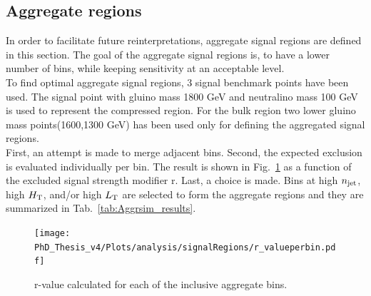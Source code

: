 \subsection{Aggregate regions}
\label{sec:aggrSR}
In order to facilitate future reinterpretations, aggregate signal regions are defined in this section. The goal of the aggregate signal regions is, to have a lower number of bins, while keeping sensitivity at an acceptable level.\\
To find optimal aggregate signal regions, 3 signal benchmark points have been used. The signal point with gluino mass 1800 GeV and neutralino mass 100 GeV is used to represent the compressed region.
For the bulk region two lower gluino mass points(1600,1300 GeV) has been used only for defining the aggregated signal regions.\\
First, an attempt is made to merge adjacent bins. 
Second, the expected exclusion is evaluated individually per bin. The result is shown in Fig.~\ref{fig:rvalues} as a function of the excluded signal strength modifier r. Last, a choice is made. Bins at high $n_{\rm jet}$, high $H_{\rm T}$, and/or high $L_{\rm T}$ are selected to form the aggregate regions and they are summarized in Tab.~\ref{tab:Aggrsim_results}.
\begin{figure}[!h]
\begin{center}
\texttt{[image: PhD\_Thesis\_v4/Plots/analysis/signalRegions/r\_valueperbin.pdf]}
\end{center}
\caption{r-value calculated for each of the inclusive aggregate bins.}
\label{fig:rvalues}
\end{figure}


